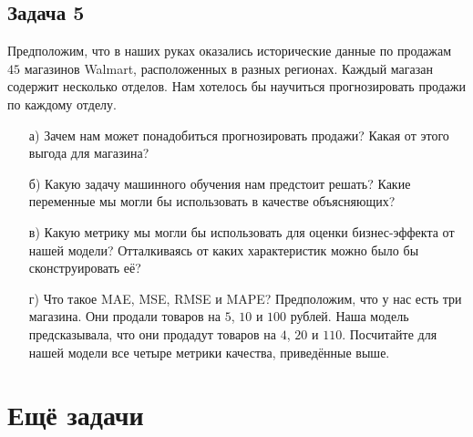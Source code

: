 \documentclass[12pt, a4paper, oneside]{article}
\begin{document}
\subsection*{Задача 5}

Предположим, что в наших руках оказались исторические данные по продажам $45$ магазинов Walmart, расположенных в разных регионах. Каждый магазан содержит несколько отделов.  Нам хотелось бы научиться прогнозировать продажи по каждому отделу. 

\begin{enumerate}
	\item[а)]  Зачем нам может понадобиться прогнозировать продажи? Какая от этого выгода для магазина? 
	\item[б)] Какую задачу машинного обучения нам предстоит решать? Какие переменные мы могли бы использовать в качестве объясняющих? 
	\item[в)] Какую метрику мы могли бы использовать для оценки бизнес-эффекта от нашей модели? Отталкиваясь от каких характеристик можно было бы сконструировать её? 
	\item[г)]  Что такое MAE, MSE,  RMSE и MAPE?  Предположим, что у нас есть три магазина. Они продали товаров на $5$, $10$ и $100$  рублей.  Наша модель предсказывала, что они продадут товаров на  $4$, $20$ и $110$. Посчитайте для нашей модели все четыре метрики качества, приведённые выше. 
\end{enumerate}




\section*{Ещё задачи}
\end{document}
